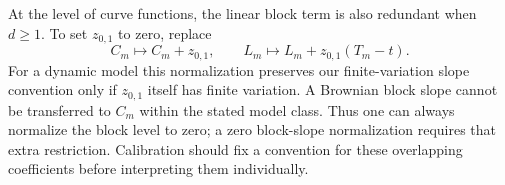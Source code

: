 At the level of curve functions, the linear block term is also redundant when $d\ge1$. To set $z_{0,1}$ to zero, replace
\[
C_m\mapsto C_m+z_{0,1},\qquad
L_m\mapsto L_m+z_{0,1}(T_m-t).
\]
For a dynamic model this normalization preserves our finite-variation slope convention only if $z_{0,1}$ itself has finite variation. A Brownian block slope cannot be transferred to $C_m$ within the stated model class. Thus one can always normalize the block level to zero; a zero block-slope normalization requires that extra restriction. Calibration should fix a convention for these overlapping coefficients before interpreting them individually.
